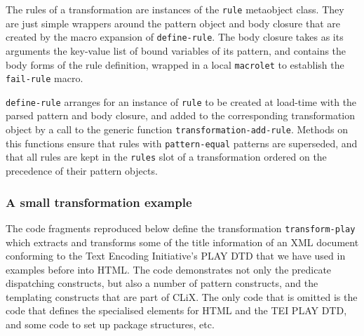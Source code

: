\documentclass[a4paper,11pt]{scrartcl}
\begin{document}
The rules of a transformation are instances of the \texttt{rule}
metaobject class.  They are just simple wrappers around the pattern
object and body closure that are created by the macro expansion of
\texttt{define-rule}.  The body closure takes as its arguments the
key-value list of bound variables of its pattern, and contains the
body forms of the rule definition, wrapped in a local
\texttt{macrolet} to establish the \texttt{fail-rule} macro.

\texttt{define-rule} arranges for an instance of \texttt{rule} to be
created at load-time with the parsed pattern and body closure, and
added to the corresponding transformation object by a call to the
generic function \texttt{transformation-add-rule}.  Methods on this
functions ensure that rules with \texttt{pattern-equal} patterns are
superseded, and that all rules are kept in the \texttt{rules} slot of
a transformation ordered on the precedence of their pattern objects.


\subsubsection{A small transformation example}

The code fragments reproduced below define the transformation
\texttt{transform-play} which extracts and transforms some of the
title information of an XML document conforming to the Text Encoding
Initiative's PLAY DTD that we have used in examples before into HTML.
The code demonstrates not only the predicate dispatching constructs,
but also a number of pattern constructs, and the templating constructs
that are part of CLiX.  The only code that is omitted is the code that
defines the specialised elements for HTML and the TEI PLAY DTD, and
some code to set up package structures, etc.
\end{document}
